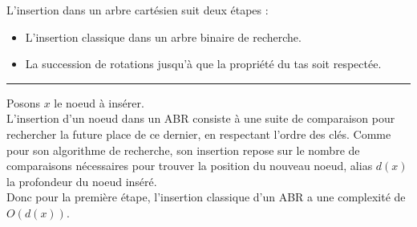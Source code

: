 \documentclass[a4paper,12pt]{report}
\begin{document}
\begin{tcolorbox}[colback=gray!10, colframe=blue!30, coltitle=black, title=Réponse à la 3.b - 1/2]

    L'insertion dans un arbre cartésien suit deux étapes :\\[-0.4cm]
    \begin{itemize}
        \item L'insertion classique dans un arbre binaire de recherche.
        \item La succession de rotations jusqu'à que la propriété du tas soit respectée.
    \end{itemize}

    \vspace{0.5cm}
    \hrule
    \vspace{0.5cm}

    Posons \( x \) le noeud à insérer.\\

    L'insertion d'un noeud dans un ABR consiste à une suite de comparaison pour rechercher la future place de ce dernier, en respectant l'ordre des clés. 
        Comme pour son algorithme de recherche, son insertion repose sur le nombre de comparaisons nécessaires pour trouver la position du nouveau noeud, 
        alias \( d(x) \) la profondeur du noeud inséré.\\

    Donc pour la première étape, l'insertion classique d'un ABR a une complexité de \( O(d(x)) \).

\end{tcolorbox}
\end{document}

